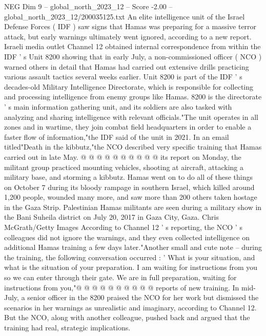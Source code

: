 \begin{textsample}{NEG Dim 9 – global\_north\_2023\_12 – Score -2.00 – global\_north\_2023\_12/200035125.txt}  \label{ex:f9_neg_295}
An elite intelligence unit of the Israel Defense Forces ( IDF ) saw signs that Hamas was preparing for a massive terror attack, but early warnings ultimately went ignored, according to a new report.
Israeli media outlet Channel 12 obtained internal correspondence from within the IDF ' s Unit 8200 showing that in early July, a non-commissioned officer ( NCO ) warned others in detail that Hamas had carried out extensive drills practicing various assault tactics several weeks earlier.
Unit 8200 is part of the IDF ' s decades-old Military Intelligence Directorate, which is responsible for collecting and processing intelligence from enemy groups like Hamas. 8200 is the directorate ' s main information gathering unit, and its soldiers are also tasked with analyzing and sharing intelligence with relevant officials."The unit operates in all zones and in wartime, they join combat field headquarters in order to enable a faster flow of information,"the IDF said of the unit in 2021.
In an email titled"Death in the kibbutz,"the NCO described very specific training that Hamas carried out in late May. @ @ @ @ @ @ @ @ @ @ its report on Monday, the militant group practiced mounting vehicles, shooting at aircraft, attacking a military base, and storming a kibbutz.
Hamas went on to do all of these things on October 7 during its bloody rampage in southern Israel, which killed around 1,200 people, wounded many more, and saw more than 200 others taken hostage in the Gaza Strip.
Palestinian Hamas militants are seen during a military show in the Bani Suheila district on July 20, 2017 in Gaza City, Gaza.
Chris McGrath/Getty Images According to Channel 12 ' s reporting, the NCO ' s colleagues did not ignore the warnings, and they even collected intelligence on additional Hamas training a few days later."Another small and cute note -- during the training, the following conversation occurred : ' What is your situation, and what is the situation of your preparation.
I am waiting for instructions from you so we can enter through their gate.
We are in full preparation, waiting for instructions from you,"@ @ @ @ @ @ @ @ @ @ reports of new training.
In mid-July, a senior officer in the 8200 praised the NCO for her work but dismissed the scenarios in her warnings as unrealistic and imaginary, according to Channel 12.
But the NCO, along with another colleague, pushed back and argued that the training had real, strategic implications.

\end{textsample}
